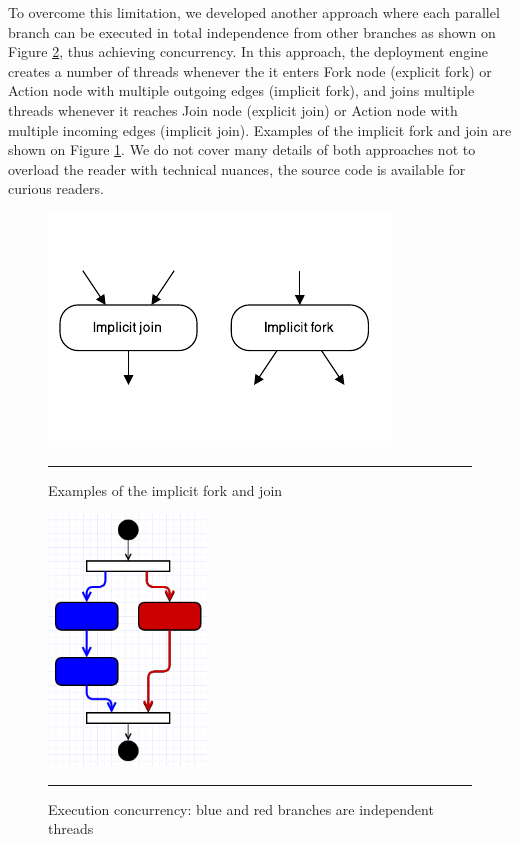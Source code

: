 \noindent To overcome this limitation, we developed another approach where each parallel branch can be executed in total independence from other branches as shown on Figure \ref{fig:concurrent}, thus achieving concurrency. In this approach, the deployment engine creates a number of threads whenever the it enters Fork node (explicit fork) or Action node with multiple outgoing edges (implicit fork), and joins multiple threads whenever it reaches Join node (explicit join) or Action node with multiple incoming edges (implicit join). Examples of the implicit fork and join are shown on Figure \ref{fig:implicit}. We do not cover many details of both approaches not to overload the reader with technical nuances, the source code is available for curious readers. 

\noindent 

\begin{figure}[htbp]
	\centering
		\includegraphics{./Figures/Implicit}
		\rule{38em}{0.5pt}
	\caption[Implicit Fork and Join]{Examples of the implicit fork and join}
	\label{fig:implicit}
\end{figure}

\noindent 

\begin{figure}[htbp]
	\centering
		\includegraphics[height=18em]{./Figures/Concurrent}
		\rule{38em}{0.5pt}
	\caption[Concurrent Algorithm]{Execution concurrency: blue and red branches are independent threads}
	\label{fig:concurrent}
\end{figure}

